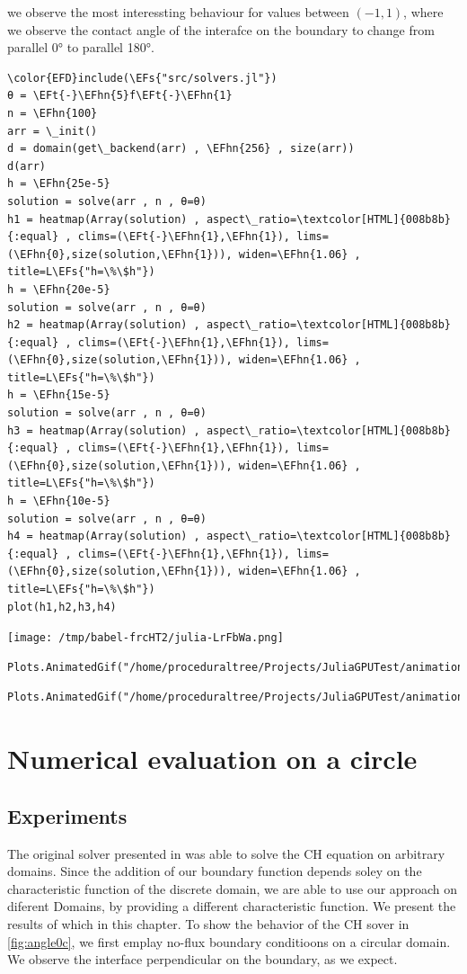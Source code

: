 \documentclass{mimosis}
\newcommand{\EFs}[1]{\textcolor{EFs}{#1}} %
\newcommand{\EFt}[1]{\textcolor{EFt}{#1}} %
\newcommand{\EFhn}[1]{\textcolor{EFhn}{#1}} %
\begin{document}
we observe the most interessting behaviour for values between \((-1,1)\), where we observe the contact angle of the interafce on the boundary to change from parallel 0° to parallel 180°.
\begin{Code}
\begin{Verbatim}
\color{EFD}include(\EFs{"src/solvers.jl"})
θ = \EFt{-}\EFhn{5}f\EFt{-}\EFhn{1}
n = \EFhn{100}
arr = \_init()
d = domain(get\_backend(arr) , \EFhn{256} , size(arr))
d(arr)
h = \EFhn{25e-5}
solution = solve(arr , n , θ=θ)
h1 = heatmap(Array(solution) , aspect\_ratio=\textcolor[HTML]{008b8b}{:equal} , clims=(\EFt{-}\EFhn{1},\EFhn{1}), lims=(\EFhn{0},size(solution,\EFhn{1})), widen=\EFhn{1.06} , title=L\EFs{"h=\%\$h"})
h = \EFhn{20e-5}
solution = solve(arr , n , θ=θ)
h2 = heatmap(Array(solution) , aspect\_ratio=\textcolor[HTML]{008b8b}{:equal} , clims=(\EFt{-}\EFhn{1},\EFhn{1}), lims=(\EFhn{0},size(solution,\EFhn{1})), widen=\EFhn{1.06} , title=L\EFs{"h=\%\$h"})
h = \EFhn{15e-5}
solution = solve(arr , n , θ=θ)
h3 = heatmap(Array(solution) , aspect\_ratio=\textcolor[HTML]{008b8b}{:equal} , clims=(\EFt{-}\EFhn{1},\EFhn{1}), lims=(\EFhn{0},size(solution,\EFhn{1})), widen=\EFhn{1.06} , title=L\EFs{"h=\%\$h"})
h = \EFhn{10e-5}
solution = solve(arr , n , θ=θ)
h4 = heatmap(Array(solution) , aspect\_ratio=\textcolor[HTML]{008b8b}{:equal} , clims=(\EFt{-}\EFhn{1},\EFhn{1}), lims=(\EFhn{0},size(solution,\EFhn{1})), widen=\EFhn{1.06} , title=L\EFs{"h=\%\$h"})
plot(h1,h2,h3,h4)
\end{Verbatim}
\end{Code}

\begin{center}
\texttt{[image: /tmp/babel-frcHT2/julia-LrFbWa.png]}
\label{fig:random-square}
\end{center}

\label{}
\begin{verbatim}
Plots.AnimatedGif("/home/proceduraltree/Projects/JuliaGPUTest/animations/h.mp4")
\end{verbatim}


\label{}
\begin{verbatim}
Plots.AnimatedGif("/home/proceduraltree/Projects/JuliaGPUTest/animations/epsilon.mp4")
\end{verbatim}
\chapter{Numerical evaluation on a circle}
\label{sec:orgad03cdd}
\section{Experiments}
\label{sec:org10cfaae}
The original solver presented in\autocite{SHIN20117441}  was able to solve the CH equation on arbitrary domains. Since the addition of our boundary function depends soley on the characteristic function of the discrete domain, we are able to use our approach on diferent Domains, by providing a different characteristic function. We present the results of which in this chapter.
To show the behavior of the CH sover in \ref{fig:angle0c}, we first emplay no-flux boundary conditioons on a circular domain. We observe the interface perpendicular on the boundary, as we expect.
\end{document}
